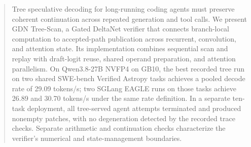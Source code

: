 \begin{abstract}
Tree speculative decoding for long-running coding agents must preserve coherent continuation across repeated generation and tool calls. We present GDN Tree-Scan, a Gated DeltaNet verifier that connects branch-local computation to accepted-path publication across recurrent, convolution, and attention state. Its implementation combines sequential scan and replay with draft-logit reuse, shared operand preparation, and attention parallelism. On Qwen3.8-27B NVFP4 on GB10, the best recorded tree run on two shared SWE-bench Verified Astropy tasks achieves a pooled decode rate of 29.09 tokens/s; two SGLang EAGLE runs on those tasks achieve 26.89 and 30.70 tokens/s under the same rate definition. In a separate ten-task deployment, all tree-served agent attempts terminated and produced nonempty patches, with no degeneration detected by the recorded trace checks. Separate arithmetic and continuation checks characterize the verifier's numerical and state-management boundaries.
\end{abstract}
